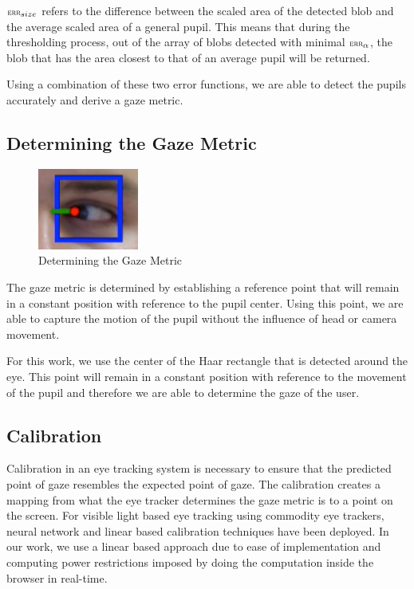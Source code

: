 \documentclass[annual]{acmsiggraph}
\newcommand{\Function}[1]{\ensuremath{{\small \textsc{#1}}}}
\begin{document}
$\Function{err}_{size}$ refers to the difference between the scaled area of the
detected blob and the average scaled area of a general pupil. This means that
during the thresholding process, out of the  array of blobs detected with
minimal $\Function{err}_{\alpha}$, the blob that has the area closest to that
of an average pupil will be returned.

Using a combination of these two error functions, we are able to detect the
pupils accurately and derive a gaze metric.

\subsection{Determining the Gaze Metric}

\begin{figure}[ht]

    \centering

    \includegraphics[width=1.3in]{figs/gazePrediction.pdf}

    \caption{Determining the Gaze Metric}

\end{figure}

The gaze metric is determined by establishing a reference point that will
remain in a constant position with reference to the pupil center. Using this
point, we are able to capture the motion of the pupil without the influence of
head or camera movement.

For this work, we use the center of the Haar rectangle that is detected around
the eye. This point will remain in a constant position with reference to the
movement of the pupil and therefore we are able to determine the gaze of the
user.

\subsection{Calibration}

Calibration in an eye tracking system is necessary to ensure that the predicted
point of gaze resembles the expected point of gaze. The calibration creates a
mapping from what the eye tracker determines the gaze metric is to a point on
the screen. For visible light based eye tracking using commodity eye trackers,
neural network \cite{holland2012eye} and linear based calibration techniques
have been deployed. In our work, we use a linear based approach due to ease of
implementation and computing power restrictions imposed by doing the
computation inside the browser in real-time.
\end{document}

